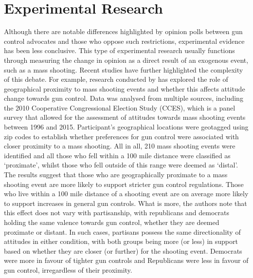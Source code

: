 \documentclass[11pt]{article}
\begin{document}
\section*{Experimental Research}
Although there are notable differences highlighted by opinion polls between gun control advocates and those who oppose such restrictions, experimental evidence has been less conclusive. This type of experimental research usually functions through measuring the change in opinion as a direct result of an exogenous event, such as a mass shooting. Recent studies have further highlighted the complexity of this debate. For example, research conducted by \textcite{newman2019mass-shootings-} has explored the role of geographical proximity to mass shooting events and whether this affects attitude change towards gun control. Data was analysed from multiple sources, including the 2010 Cooperative Congressional Election Study (CCES), which is a panel survey that allowed for the assessment of attitudes towards mass shooting events between 1996 and 2015. Participant’s geographical locations were geotagged using zip codes to establish whether preferences for gun control were associated with closer proximity to a mass shooting. All in all, 210 mass shooting events were identified and all those who fell within a 100 mile distance were classified as ‘proximate’, whilst those who fell outside of this range were deemed as ‘distal’. The results suggest that those who are geographically proximate to a mass shooting event are more likely to support stricter gun control regulations. Those who live within a 100 mile distance of a shooting event are on average more likely to support increases in general gun controls. What is more, the authors note that this effect does not vary with partisanship, with republicans and democrats holding the same valence towards gun control, whether they are deemed proximate or distant. In such cases, partisans possess the same directionality of attitudes in either condition, with both groups being more (or less) in support based on whether they are closer (or further) for the shooting event. Democrats were more in favour of tighter gun controls and Republicans were less in favour of gun control, irregardless of their proximity.
\end{document}
